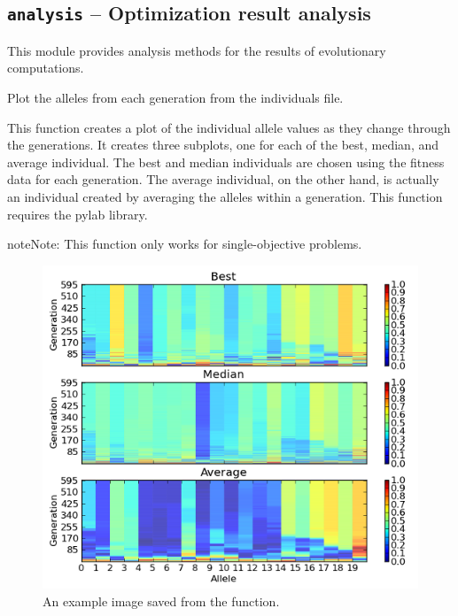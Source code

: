 \documentclass[letterpaper,10pt,english]{sphinxmanual}
\begin{document}
\label{reference:module-inspyred.ec.analysis}

\subsection{\texttt{analysis} -- Optimization result analysis}
\label{reference:analysis-optimization-result-analysis}
This module provides analysis methods for the results of evolutionary computations.
\label{reference:module-analysis}

\begin{fulllineitems}
\label{reference:inspyred.ec.analysis.allele_plot}
Plot the alleles from each generation from the individuals file.

This function creates a plot of the individual allele values as they
change through the generations. It creates three subplots, one for each
of the best, median, and average individual. The best and median 
individuals are chosen using the fitness data for each generation. The 
average individual, on the other hand, is actually an individual created
by averaging the alleles within a generation. This function requires the 
pylab library.

\begin{notice}{note}{Note:}
This function only works for single-objective problems.
\end{notice}
\begin{figure}[htbp]
\centering
\capstart

\includegraphics{allele_plot.png}
\caption{An example image saved from the  function.}\end{figure}


\end{fulllineitems}
\end{document}
